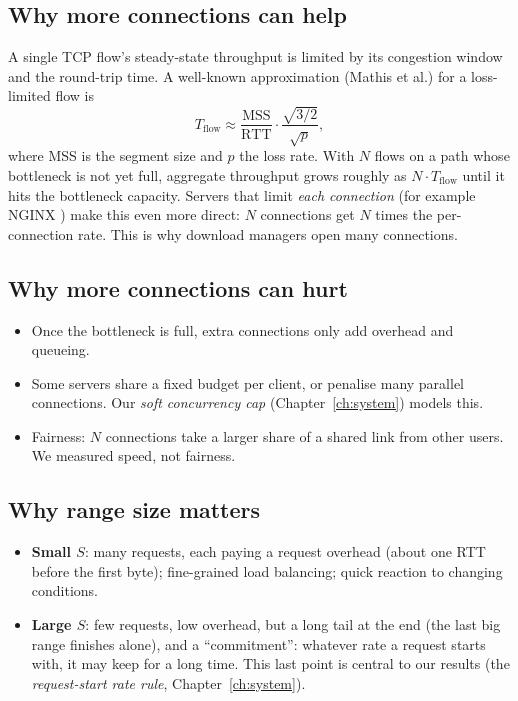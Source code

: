 \subsection{Why more connections can help}
A single TCP flow's steady-state throughput is limited by its congestion window and the round-trip time. A well-known approximation (Mathis et al.) for a loss-limited flow is
\begin{equation}
T_{\text{flow}} \approx \frac{\text{MSS}}{\text{RTT}}\cdot\frac{\sqrt{3/2}}{\sqrt{p}},
\end{equation}
where MSS is the segment size and $p$ the loss rate. With $N$ flows on a path whose bottleneck is not yet full, aggregate throughput grows roughly as $N\cdot T_{\text{flow}}$ until it hits the bottleneck capacity. Servers that limit \emph{each connection} (for example NGINX ) make this even more direct: $N$ connections get $N$ times the per-connection rate. This is why download managers open many connections.

\subsection{Why more connections can hurt}
\begin{itemize}
\item Once the bottleneck is full, extra connections only add overhead and queueing.
\item Some servers share a fixed budget per client, or penalise many parallel connections. Our \emph{soft concurrency cap} (Chapter~\ref{ch:system}) models this.
\item Fairness: $N$ connections take a larger share of a shared link from other users. We measured speed, not fairness.
\end{itemize}

\subsection{Why range size matters}
\begin{itemize}
\item \textbf{Small $S$}: many requests, each paying a request overhead (about one RTT before the first byte); fine-grained load balancing; quick reaction to changing conditions.
\item \textbf{Large $S$}: few requests, low overhead, but a long tail at the end (the last big range finishes alone), and a ``commitment'': whatever rate a request starts with, it may keep for a long time. This last point is central to our results (the \emph{request-start rate rule}, Chapter~\ref{ch:system}).
\end{itemize}

